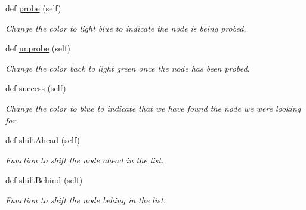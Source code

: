 \begin{DoxyCompactItemize}
\mbox{\label{class_singly_linked_list_1_1_singly_linked_list_node_acef058b54a5cc6cce223cdad32d0e546}} 
def \hyperlink{class_singly_linked_list_1_1_singly_linked_list_node_acef058b54a5cc6cce223cdad32d0e546}{probe} (self)
\begin{DoxyCompactList}\small\item\em Change the color to light blue to indicate the node is being probed. \end{DoxyCompactList}\item 
\mbox{\label{class_singly_linked_list_1_1_singly_linked_list_node_a8c96a79dc1f27ca37ab82dcd80bcac51}} 
def \hyperlink{class_singly_linked_list_1_1_singly_linked_list_node_a8c96a79dc1f27ca37ab82dcd80bcac51}{unprobe} (self)
\begin{DoxyCompactList}\small\item\em Change the color back to light green once the node has been probed. \end{DoxyCompactList}\item 
\mbox{\label{class_singly_linked_list_1_1_singly_linked_list_node_a93b77e8258a5fc14305a11ba27eab8f3}} 
def \hyperlink{class_singly_linked_list_1_1_singly_linked_list_node_a93b77e8258a5fc14305a11ba27eab8f3}{success} (self)
\begin{DoxyCompactList}\small\item\em Change the color to blue to indicate that we have found the node we were looking for. \end{DoxyCompactList}\item 
\mbox{\label{class_singly_linked_list_1_1_singly_linked_list_node_aabccf02e114b5abb5fd40a7cc7ab240b}} 
def \hyperlink{class_singly_linked_list_1_1_singly_linked_list_node_aabccf02e114b5abb5fd40a7cc7ab240b}{shift\+Ahead} (self)
\begin{DoxyCompactList}\small\item\em Function to shift the node ahead in the list. \end{DoxyCompactList}\item 
\mbox{\label{class_singly_linked_list_1_1_singly_linked_list_node_ab7d981efc16e32b20f6653aa579f3f3b}} 
def \hyperlink{class_singly_linked_list_1_1_singly_linked_list_node_ab7d981efc16e32b20f6653aa579f3f3b}{shift\+Behind} (self)
\begin{DoxyCompactList}\small\item\em Function to shift the node behing in the list. \end{DoxyCompactList}\end{DoxyCompactItemize}
